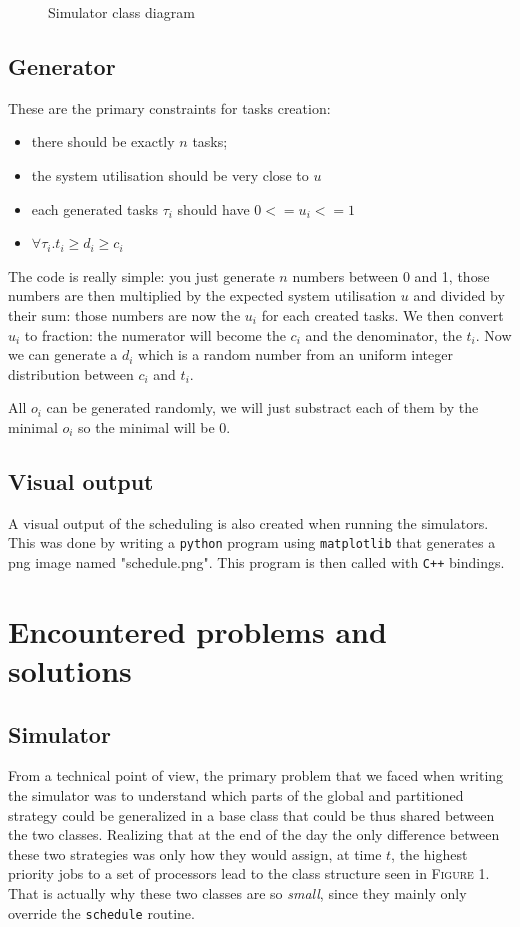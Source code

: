 \documentclass[a4paper]{article}
\begin{document}
\begin{figure}[H]
  \centering
  \caption{Simulator class diagram}
\end{figure}


\subsection{Generator}
\label{gendesc}
These are the primary constraints for tasks creation:
\begin{itemize}
  \item there should be exactly $n$ tasks;
  \item the system utilisation should be very close to $u$
  \item each generated tasks $\tau_i$ should have $0 <= u_i <= 1$
  \item $\forall \tau_i. t_i \geq d_i \geq c_i$
\end{itemize}

The code is really simple: you just generate $n$ numbers between 0 and 1, those numbers are then multiplied by the expected system utilisation $u$ and divided by their sum: those numbers are now the $u_i$ for each created tasks.
We then convert $u_i$ to fraction: the numerator will become the $c_i$ and the denominator, the $t_i$. Now we can generate a $d_i$ which is a random number from an uniform integer distribution between $c_i$ and $t_i$.

All $o_i$ can be generated randomly, we will just substract each of them by the minimal $o_i$ so the minimal will be 0.

\subsection{Visual output}
A visual output of the scheduling is also created when running the simulators. This was done by writing a \texttt{python} program using \texttt{matplotlib} that generates a png image named "schedule.png". This program is then called with \texttt{C++} bindings.

\section{Encountered problems and solutions}

\subsection{Simulator}
From a technical point of view, the primary problem that we faced when writing the simulator was to understand which parts of the global and partitioned strategy could be generalized in a base class that could be thus shared between the two classes. Realizing that at the end of the day the only difference between these two strategies was only how they would assign, at time $t$, the highest priority jobs to a set of processors lead to the class structure seen in \textsc{Figure 1}. That is actually why these two classes are so \textit{small}, since they mainly only override the \texttt{schedule} routine.
\end{document}
